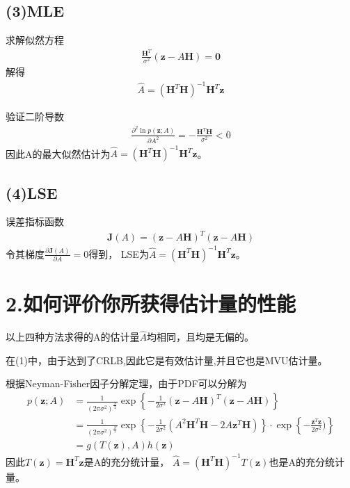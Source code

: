 \documentclass[fontset=windows]{article}
\numberwithin{figure}{section}
\begin{document}
\subsection*{(3)MLE}
求解似然方程
\begin{align*}
    \frac{\mathbf{H}^T}{\sigma^2}(\mathbf{z}-A\mathbf{H})=\mathbf{0}
\end{align*}
解得
\begin{align*}
    \hat{A}=(\mathbf{H}^T\mathbf{H})^{-1}\mathbf{H}^T \mathbf{z}
\end{align*}

验证二阶导数
\begin{align*}
    \frac{\partial^2 \ln p(\mathbf{z};A)}{\partial A^2}
    =-\frac{\mathbf{H}^T\mathbf{H}}{\sigma^2}<0
\end{align*}
因此A的最大似然估计为\(\hat{A}=(\mathbf{H}^T\mathbf{H})^{-1}\mathbf{H}^T \mathbf{z}\)。

\subsection*{(4)LSE}
误差指标函数
\begin{align*}
    \mathbf{J}(A)=(\mathbf{z}-A\mathbf{H})^T(\mathbf{z}-A\mathbf{H})
\end{align*}
令其梯度\(\frac{\partial\mathbf{J}(A)}{\partial A}=0\)得到，
LSE为\(\hat{A}=(\mathbf{H}^T\mathbf{H})^{-1}\mathbf{H}^T\mathbf{z}\)。

\section*{2.如何评价你所获得估计量的性能}

以上四种方法求得的A的估计量\(\hat{A}\)均相同，且均是无偏的。

在(1)中，由于达到了CRLB,因此它是有效估计量,并且它也是MVU估计量。

根据Neyman-Fisher因子分解定理，由于PDF可以分解为
\begin{align*}
    p(\mathbf{z};A)
     & =\frac{1}{(2\pi \sigma^2)^{\frac{N}{2}}}
    \exp\left\{-\frac{1}{2\sigma^2}(\mathbf{z}-A\mathbf{H})^T(\mathbf{z}-A\mathbf{H})\right\} \\
     & =\frac{1}{(2\pi \sigma^2)^{\frac{N}{2}}}
    \exp\left\{-\frac{1}{2\sigma^2}(A^2\mathbf{H}^T\mathbf{H}-2A\mathbf{z}^T\mathbf{H})\right\}
    \cdot\exp\left\{-\frac{\mathbf{z}^T\mathbf{z}}{2\sigma^2})\right\}                        \\
     & =g(T(\mathbf{z}),A)h(\mathbf{z})
\end{align*}
因此\(T(\mathbf{z})=\mathbf{H}^T\mathbf{z}\)是A的充分统计量，
\(\hat{A}=(\mathbf{H}^T\mathbf{H})^{-1}T(\mathbf{z})\)也是A的充分统计量。


\end{document}
